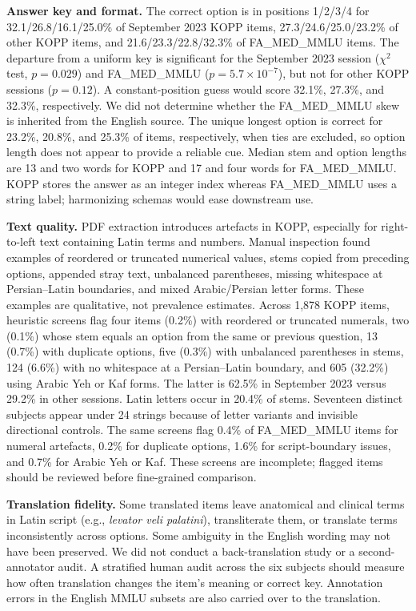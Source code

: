 \documentclass[manuscript,screen,review]{acmart}
\begin{document}
\textbf{Answer key and format.} The correct option is in positions 1/2/3/4 for 32.1/26.8/16.1/25.0\% of September 2023 KOPP items, 27.3/24.6/25.0/23.2\% of other KOPP items, and 21.6/23.3/22.8/32.3\% of FA\_MED\_MMLU items. The departure from a uniform key is significant for the September 2023 session ($\chi^2$ test, $p=0.029$) and FA\_MED\_MMLU ($p=5.7\times10^{-7}$), but not for other KOPP sessions ($p=0.12$). A constant-position guess would score 32.1\%, 27.3\%, and 32.3\%, respectively. We did not determine whether the FA\_MED\_MMLU skew is inherited from the English source. The unique longest option is correct for 23.2\%, 20.8\%, and 25.3\% of items, respectively, when ties are excluded, so option length does not appear to provide a reliable cue. Median stem and option lengths are 13 and two words for KOPP and 17 and four words for FA\_MED\_MMLU. KOPP stores the answer as an integer index whereas FA\_MED\_MMLU uses a string label; harmonizing schemas would ease downstream use.

\textbf{Text quality.} PDF extraction introduces artefacts in KOPP, especially for right-to-left text containing Latin terms and numbers. Manual inspection found examples of reordered or truncated numerical values, stems copied from preceding options, appended stray text, unbalanced parentheses, missing whitespace at Persian--Latin boundaries, and mixed Arabic/Persian letter forms. These examples are qualitative, not prevalence estimates. Across 1,878 KOPP items, heuristic screens flag four items (0.2\%) with reordered or truncated numerals, two (0.1\%) whose stem equals an option from the same or previous question, 13 (0.7\%) with duplicate options, five (0.3\%) with unbalanced parentheses in stems, 124 (6.6\%) with no whitespace at a Persian--Latin boundary, and 605 (32.2\%) using Arabic Yeh or Kaf forms. The latter is 62.5\% in September 2023 versus 29.2\% in other sessions. Latin letters occur in 20.4\% of stems. Seventeen distinct subjects appear under 24 strings because of letter variants and invisible directional controls. The same screens flag 0.4\% of FA\_MED\_MMLU items for numeral artefacts, 0.2\% for duplicate options, 1.6\% for script-boundary issues, and 0.7\% for Arabic Yeh or Kaf. These screens are incomplete; flagged items should be reviewed before fine-grained comparison.

\textbf{Translation fidelity.} Some translated items leave anatomical and clinical terms in Latin script (e.g., \emph{levator veli palatini}), transliterate them, or translate terms inconsistently across options. Some ambiguity in the English wording may not have been preserved. We did not conduct a back-translation study or a second-annotator audit. A stratified human audit across the six subjects should measure how often translation changes the item's meaning or correct key. Annotation errors in the English MMLU subsets are also carried over to the translation.
\end{document}
